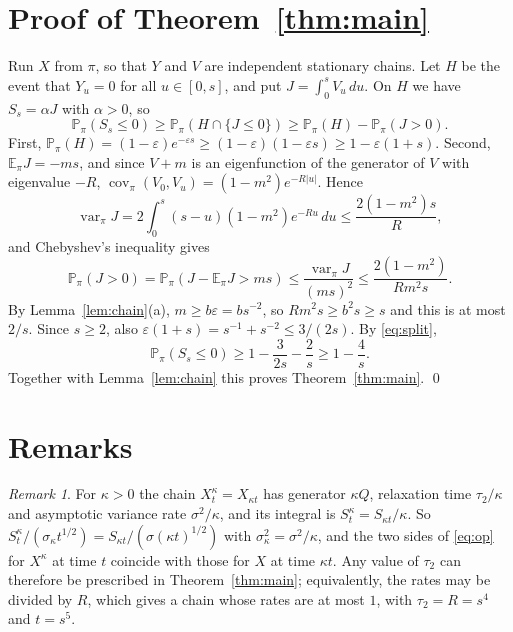 \documentclass[11pt]{amsart}
\theoremstyle{remark}
\newtheorem{remark}{Remark}
\numberwithin{equation}{section}
\newcommand{\Pp}{\mathbb P}
\newcommand{\E}{\mathbb E}
\DeclareMathOperator{\var}{var}
\DeclareMathOperator{\cov}{cov}
\begin{document}
\section{Proof of Theorem~\ref{thm:main}}\label{sec:proof}

Run $X$ from $\pi$, so that $Y$ and $V$ are independent stationary chains. Let $H$ be the event that $Y_u=0$ for all $u\in[0,s]$, and put $J=\int_0^sV_u\,du$. On $H$ we have $S_s=\alpha J$ with $\alpha>0$, so
\begin{equation}\label{eq:split}
\Pp_\pi(S_s\le0)\ge\Pp_\pi(H\cap\{J\le0\})\ge\Pp_\pi(H)-\Pp_\pi(J>0).
\end{equation}
First, $\Pp_\pi(H)=(1-\varepsilon)e^{-\varepsilon s}\ge(1-\varepsilon)(1-\varepsilon s)\ge1-\varepsilon(1+s)$. Second, $\E_\pi J=-ms$, and since $V+m$ is an eigenfunction of the generator of $V$ with eigenvalue $-R$, $\cov_\pi(V_0,V_u)=(1-m^2)e^{-R|u|}$. Hence
\[
\var_\pi J=2\int_0^s(s-u)(1-m^2)e^{-Ru}\,du\le\frac{2(1-m^2)s}R ,
\]
and Chebyshev's inequality gives
\[
\Pp_\pi(J>0)=\Pp_\pi(J-\E_\pi J>ms)\le\frac{\var_\pi J}{(ms)^2}\le\frac{2(1-m^2)}{Rm^2s}.
\]
By Lemma~\ref{lem:chain}(a), $m\ge b\varepsilon=bs^{-2}$, so $Rm^2s\ge b^2s\ge s$ and this is at most $2/s$. Since $s\ge2$, also $\varepsilon(1+s)=s^{-1}+s^{-2}\le3/(2s)$. By \eqref{eq:split},
\[
\Pp_\pi(S_s\le0)\ge1-\frac3{2s}-\frac2s\ge1-\frac4s .
\]
Together with Lemma~\ref{lem:chain} this proves Theorem~\ref{thm:main}. \qed

\section{Remarks}\label{sec:remarks}

\begin{remark}\label{rem:scale}
For $\kappa>0$ the chain $X^\kappa_t=X_{\kappa t}$ has generator $\kappa Q$, relaxation time $\tau_2/\kappa$ and asymptotic variance rate $\sigma^2/\kappa$, and its integral is $S^\kappa_t=S_{\kappa t}/\kappa$. So $S^\kappa_t/(\sigma_\kappa t^{1/2})=S_{\kappa t}/(\sigma(\kappa t)^{1/2})$ with $\sigma_\kappa^2=\sigma^2/\kappa$, and the two sides of \eqref{eq:op} for $X^\kappa$ at time $t$ coincide with those for $X$ at time $\kappa t$. Any value of $\tau_2$ can therefore be prescribed in Theorem~\ref{thm:main}; equivalently, the rates may be divided by $R$, which gives a chain whose rates are at most $1$, with $\tau_2=R=s^4$ and $t=s^5$.
\end{remark}
\end{document}
